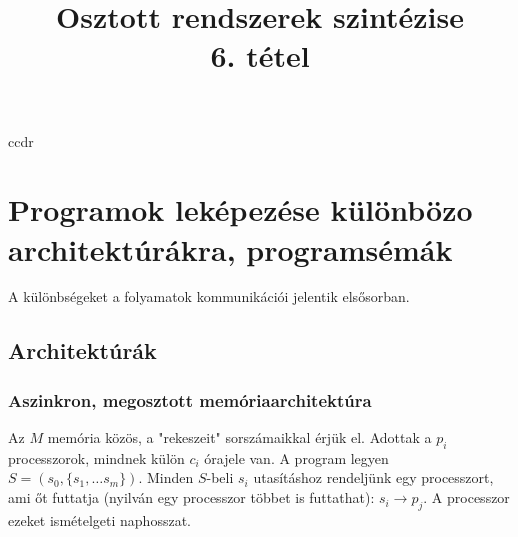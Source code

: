 ccdr\documentclass{article}
\title{Osztott rendszerek szintézise\\6. tétel}
\begin{document}

\section*{Programok leképezése különbözo architektúrákra, programsémák}
A különbségeket a folyamatok kommunikációi jelentik elsősorban.
\subsection*{Architektúrák}
\subsubsection*{Aszinkron, megosztott memóriaarchitektúra}
%
%

Az $M$ memória közös, a "rekeszeit" sorszámaikkal érjük el. Adottak a $p_i$ processzorok, mindnek külön $c_i$ órajele van. A program legyen $S = ( s_0, \lbrace s_1,\dots s_m \rbrace)$. Minden $S$-beli $s_i$ utasításhoz rendeljünk egy processzort, ami őt futtatja (nyilván egy processzor többet is futtathat): $s_i \rightarrow p_j$. A processzor ezeket ismételgeti naphosszat.
\end{document}
